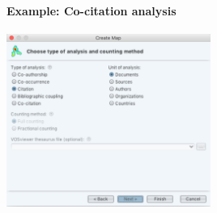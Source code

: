 \documentclass[8pt]{beamer}
\begin{document}
\begin{frame}
\begin{columns}

\end{columns}

\end{frame}


\begin{frame}
\frametitle{\insertsection}
\framesubtitle{Example: Co-citation analysis}

\centering
\includegraphics[width= 0.5\textwidth]{voscocitation}

\end{frame}

\end{document}
